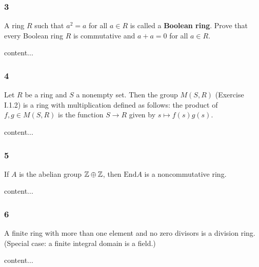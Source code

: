 \subsubsection*{3}
\begin{graybox}
	A ring $R$ such that $a^2 = a$ for all $a \in R$ is called a \textbf{Boolean ring}. Prove that every Boolean ring $R$ is commutative and $a + a = 0$ for all $a \in R$.
\end{graybox}
\begin{solution}
	content...
\end{solution}

\subsubsection*{4}
\begin{graybox}
	Let $R$ be a ring and $S$ a nonempty set. Then the group $M(S,R)$ (Exercise I.1.2) is a ring with multiplication defined as follows: the product of $f, g \in M(S,R)$ is the function $S \to R$ given by $s \mapsto f(s)g(s)$.
\end{graybox}
\begin{solution}
	content...
\end{solution}

\subsubsection*{5}
\begin{graybox}
	If $A$ is the abelian group $\mathbb{Z} \oplus \mathbb{Z}$, then $\text{End} A$ is a noncommutative ring.
\end{graybox}
\begin{solution}
	content...
\end{solution}

\subsubsection*{6}
\begin{graybox}
	A finite ring with more than one element and no zero divisors is a division ring. (Special case: a finite integral domain is a field.)
\end{graybox}
\begin{solution}
	content...
\end{solution}



